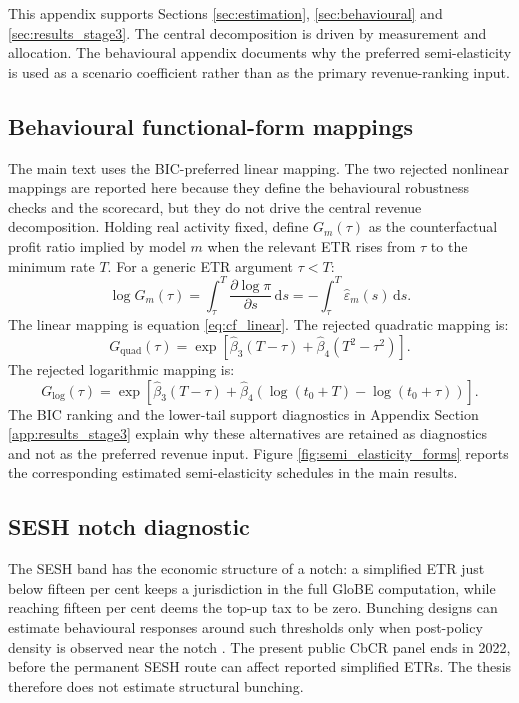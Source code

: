 \documentclass[11pt,a4paper]{article}
\begin{document}
This appendix supports Sections \ref{sec:estimation}, \ref{sec:behavioural} and \ref{sec:results_stage3}. The central decomposition is driven by measurement and allocation. The behavioural appendix documents why the preferred semi-elasticity is used as a scenario coefficient rather than as the primary revenue-ranking input.

\subsection{Behavioural functional-form mappings}\label{app:behavioural_details}

The main text uses the BIC-preferred linear mapping. The two rejected nonlinear mappings are reported here because they define the behavioural robustness checks and the scorecard, but they do not drive the central revenue decomposition. Holding real activity fixed, define $G_m(\tau)$ as the counterfactual profit ratio implied by model $m$ when the relevant ETR rises from $\tau$ to the minimum rate $T$. For a generic ETR argument $\tau<T$:
\begin{equation}\label{eq:cf_integral}
\log G_m(\tau) = \int_{\tau}^{T}\frac{\partial \log \pi}{\partial s}\,\mathrm{d}s = -\int_{\tau}^{T}\hat{\varepsilon}_m(s)\,\mathrm{d}s.
\end{equation}
The linear mapping is equation \eqref{eq:cf_linear}. The rejected quadratic mapping is:
\begin{equation}\label{eq:cf_quad}
G_{\text{quad}}(\tau) = \exp\!\left[\hat{\beta}_3(T-\tau) + \hat{\beta}_4(T^2-\tau^2)\right].
\end{equation}
The rejected logarithmic mapping is:
\begin{equation}\label{eq:cf_log}
G_{\text{log}}(\tau) = \exp\!\left[\hat{\beta}_3(T-\tau) + \hat{\beta}_4\left(\log(t_0+T)-\log(t_0+\tau)\right)\right].
\end{equation}
The BIC ranking and the lower-tail support diagnostics in Appendix Section \ref{app:results_stage3} explain why these alternatives are retained as diagnostics and not as the preferred revenue input. Figure \ref{fig:semi_elasticity_forms} reports the corresponding estimated semi-elasticity schedules in the main results.

\subsection{SESH notch diagnostic}\label{app:sesh_details}

The SESH band has the economic structure of a notch: a simplified ETR just below fifteen per cent keeps a jurisdiction in the full GloBE computation, while reaching fifteen per cent deems the top-up tax to be zero. Bunching designs can estimate behavioural responses around such thresholds only when post-policy density is observed near the notch \citep{saez2010,kleven2013,kleven2016}. The present public CbCR panel ends in 2022, before the permanent SESH route can affect reported simplified ETRs. The thesis therefore does not estimate structural bunching.
\end{document}
